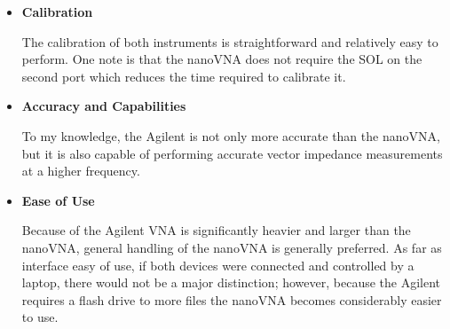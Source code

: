 \documentclass[journal]{IEEEtran}
\begin{document}
\begin{itemize}
    \item \textbf{Calibration}

          The calibration of both instruments is straightforward and relatively easy
          to perform. One note is that the nanoVNA does not require the SOL on the
          second port which reduces the time required to calibrate it.

    \item \textbf{Accuracy and Capabilities}

          To my knowledge, the Agilent is not only more accurate than the
          nanoVNA, but it is also capable of performing accurate vector
          impedance measurements at a higher frequency.

    \item \textbf{Ease of Use}

          Because of the Agilent VNA is significantly heavier and larger than the
          nanoVNA, general handling of the nanoVNA is generally preferred. As far
          as interface easy of use, if both devices were connected and controlled
          by a laptop,  there would not be a major distinction; however, because
          the Agilent requires a flash drive to more files the nanoVNA becomes
          considerably easier to use.

\end{itemize}

\end{document}

